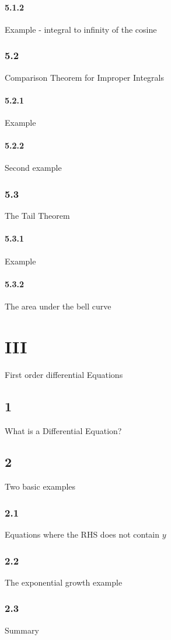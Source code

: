 \subsubsection{5.1.2}{Example - integral to infinity of the cosine}
\subsection{5.2}{Comparison Theorem for Improper Integrals}
\subsubsection{5.2.1}{Example}
\subsubsection{5.2.2}{Second example}
\subsection{5.3}{The Tail Theorem}
\subsubsection{5.3.1}{Example}
\subsubsection{5.3.2}{The area under the bell curve}

\chapter{III}{First order differential Equations}
\section{1}{What is a Differential Equation?}
\section{2}{Two basic examples}
\subsection{2.1}{Equations where the RHS does not contain $y$}
\subsection{2.2}{The exponential growth example}
\subsection{2.3}{Summary}
